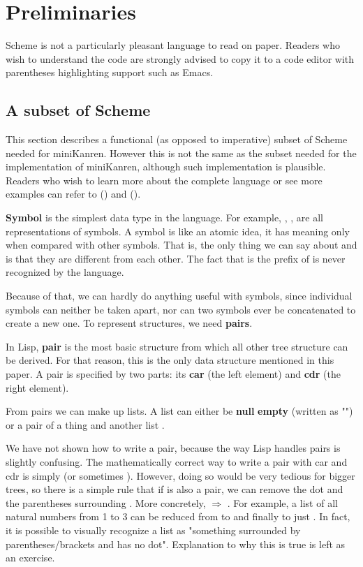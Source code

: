 \section{Preliminaries}
\label{prelim}
Scheme is not a particularly pleasant language to read on paper.
Readers who wish to understand the code are strongly advised to copy it to a code editor with parentheses highlighting support such as Emacs.

\subsection{A subset of Scheme}
This section describes a functional (as opposed to imperative) subset of Scheme needed for miniKanren. However this is not the same as the subset needed for the implementation of miniKanren, although such implementation is plausible.
Readers who wish to learn more about the complete language or see more examples can refer to (\textcite{tspl4}) and (\textcite{sicp}).

\textbf{Symbol} is the simplest data type in the language. For example, , ,  are all representations of symbols.
A symbol is like an atomic idea, it has meaning only when compared with other symbols. That is, the only thing we can say about  and  is that they are different from each other. The fact that  is the prefix of  is never recognized by the language.

Because of that, we can hardly do anything useful with symbols, since individual symbols can neither be taken apart, nor can two symbols ever be concatenated to create a new one. To represent structures, we need \textbf{pairs}.

In Lisp, \textbf{pair} is the most basic structure from which all other tree structure can be derived.
For that reason, this is the only data structure mentioned in this paper.
A pair is specified by two parts: its \textbf{car} (the left element) and \textbf{cdr} (the right element).

From pairs we can make up lists. A list can either be \textbf{null} \textbf{empty} (written as "\code{()}") or a pair of a thing  and another list .

We have not shown how to write a pair, because the way Lisp handles pairs is slightly confusing. The mathematically correct way to write a pair with car  and cdr  is simply  (or sometimes \code{[a . d]}).
However, doing so would be very tedious for bigger trees, so there is a simple rule that if  is also a pair, we can remove the dot and the parentheses surrounding . More concretely,  $\Rightarrow$ .
For example, a list of all natural numbers from 1 to 3 can be reduced from  to  and finally to just . In fact, it is possible to visually recognize a list as "something surrounded by parentheses/brackets and has no dot". Explanation to why this is true is left as an exercise.

